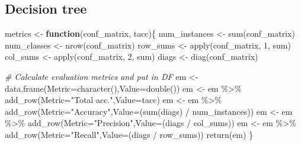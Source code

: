 \documentclass[
]{article}
\newenvironment{Shaded}{\begin{snugshade}}{\end{snugshade}}
\newcommand{\AttributeTok}[1]{\textcolor[rgb]{0.77,0.63,0.00}{#1}}
\newcommand{\CommentTok}[1]{\textcolor[rgb]{0.56,0.35,0.01}{\textit{#1}}}
\newcommand{\ControlFlowTok}[1]{\textcolor[rgb]{0.13,0.29,0.53}{\textbf{#1}}}
\newcommand{\DecValTok}[1]{\textcolor[rgb]{0.00,0.00,0.81}{#1}}
\newcommand{\FunctionTok}[1]{\textcolor[rgb]{0.00,0.00,0.00}{#1}}
\newcommand{\NormalTok}[1]{#1}
\newcommand{\OtherTok}[1]{\textcolor[rgb]{0.56,0.35,0.01}{#1}}
\newcommand{\SpecialCharTok}[1]{\textcolor[rgb]{0.00,0.00,0.00}{#1}}
\newcommand{\StringTok}[1]{\textcolor[rgb]{0.31,0.60,0.02}{#1}}
\begin{document}
\hypertarget{decision-tree}{%
\subsection{Decision tree}\label{decision-tree}}

\begin{Shaded}
\begin{Highlighting}[]
\NormalTok{metrics }\OtherTok{\textless{}{-}} \ControlFlowTok{function}\NormalTok{(conf\_matrix, tacc)\{}
\NormalTok{  num\_instances }\OtherTok{\textless{}{-}} \FunctionTok{sum}\NormalTok{(conf\_matrix)}
\NormalTok{  num\_classes }\OtherTok{\textless{}{-}} \FunctionTok{nrow}\NormalTok{(conf\_matrix)}
\NormalTok{  row\_sums }\OtherTok{\textless{}{-}} \FunctionTok{apply}\NormalTok{(conf\_matrix, }\DecValTok{1}\NormalTok{, sum)}
\NormalTok{  col\_sums }\OtherTok{\textless{}{-}} \FunctionTok{apply}\NormalTok{(conf\_matrix, }\DecValTok{2}\NormalTok{, sum)}
\NormalTok{  diags }\OtherTok{\textless{}{-}} \FunctionTok{diag}\NormalTok{(conf\_matrix)}
  
  \CommentTok{\# Calculate evaluation metrics and put in DF}
\NormalTok{  em }\OtherTok{\textless{}{-}} \FunctionTok{data.frame}\NormalTok{(}\AttributeTok{Metric=}\FunctionTok{character}\NormalTok{(),}\AttributeTok{Value=}\FunctionTok{double}\NormalTok{())}
\NormalTok{  em }\OtherTok{\textless{}{-}}\NormalTok{ em }\SpecialCharTok{\%\textgreater{}\%}
    \FunctionTok{add\_row}\NormalTok{(}\AttributeTok{Metric=}\StringTok{"Total acc."}\NormalTok{,}\AttributeTok{Value=}\NormalTok{tacc)}
\NormalTok{  em }\OtherTok{\textless{}{-}}\NormalTok{ em }\SpecialCharTok{\%\textgreater{}\%}
    \FunctionTok{add\_row}\NormalTok{(}\AttributeTok{Metric=}\StringTok{"Accuracy"}\NormalTok{,}\AttributeTok{Value=}\NormalTok{(}\FunctionTok{sum}\NormalTok{(diags) }\SpecialCharTok{/}\NormalTok{ num\_instances))}
\NormalTok{  em }\OtherTok{\textless{}{-}}\NormalTok{ em }\SpecialCharTok{\%\textgreater{}\%}
    \FunctionTok{add\_row}\NormalTok{(}\AttributeTok{Metric=}\StringTok{"Precision"}\NormalTok{,}\AttributeTok{Value=}\NormalTok{(diags }\SpecialCharTok{/}\NormalTok{ col\_sums))}
\NormalTok{  em }\OtherTok{\textless{}{-}}\NormalTok{ em }\SpecialCharTok{\%\textgreater{}\%}
    \FunctionTok{add\_row}\NormalTok{(}\AttributeTok{Metric=}\StringTok{"Recall"}\NormalTok{,}\AttributeTok{Value=}\NormalTok{(diags }\SpecialCharTok{/}\NormalTok{ row\_sums))}
  \FunctionTok{return}\NormalTok{(em)}
\NormalTok{\}}
\end{Highlighting}
\end{Shaded}
\end{document}
